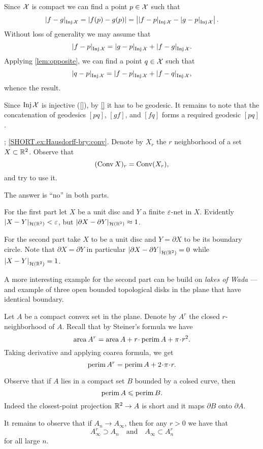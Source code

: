 Since $\mathcal{X}$ is compact we can find a point $p\in\mathcal{X}$ such that 
\[\dist{f}{g}{\Inj\spc{X}}=|f(p)-g(p)|=\left|\dist{f}{p}{\Inj\spc{X}}-\dist{g}{p}{\Inj\spc{X}}\right|.\]
Without loss of generality we may assume that 
\[\dist{f}{p}{\Inj\spc{X}}
=
\dist{g}{p}{\Inj\spc{X}}
+
\dist{f}{g}{\Inj\spc{X}}.\]
Applying \ref{lem:opposite}, we can find a point $q\in\mathcal{X}$ such that 
\[\dist{q}{p}{\Inj\spc{X}}
=
\dist{f}{p}{\Inj\spc{X}}
+
\dist{f}{q}{\Inj\spc{X}},\]
whence the result.

Since $\mathop{\rm Inj}\nolimits\mathcal{X}$ is injective (\ref{}), by \ref{} it has to be geodesic. It remains to note that the concatenation of geodesics $[pq]$, $[gf]$, and $[fq]$ forms a required geodesic $[pq]$.


; \ref{SHORT.ex:Hausdorff-bry:conv}.
Denote by $X_r$ the $r$ neighborhood of a set $X\z\subset \RR^2$.
Observe  that 
\[(\mathop{\rm Conv}\nolimits X)_r=\mathop{\rm Conv}\nolimits(X_r),\]
and try to use it.

The answer is ``no'' in both parts.

For the first part let $X$ be a unit disc and $Y$ a finite $\varepsilon$-net in $X$.
Evidently $|X-Y|_{\mathcal{H}(\mathbb{R}^2)}<\varepsilon$, 
but
$|\partial X-\partial Y|_{\mathcal{H}(\mathbb{R}^2)}\approx 1$.

For the second part take $X$ to be a unit disc and $Y=\partial X$ to be its boundary circle.
Note that $\partial X=\partial Y$ in particular $\dist{\partial X}{\partial Y}{\mathcal{H}(\RR^2)}=0$ while $\dist{ X}{ Y}{\mathcal{H}(\RR^2)}=1$.

A more interesting example for the second part can be build on {}\emph{lakes of Wada} --- and example of three open bounded topological disks in the plane that have identical boundary.

Let $A$ be a compact convex set in the plane.
Denote by $A^r$ the closed $r$-neighborhood of $A$.
Recall that by Steiner's formula we have
\[\area A^r=\area A+r\cdot\perim A+\pi\cdot r^2.\]
Taking derivative and applying coarea formula, we get 
\[\perim A^r=\perim A+2\cdot\pi\cdot r.\]

Observe that if $A$ lies in a compact set $B$ bounded by a colsed curve, then 
\[\operatorname{\rm perim}\nolimits A\leqslant \operatorname{\rm perim}\nolimits B.\]
Indeed the closest-point projection $\mathbb{R}^2\to A$ is short and it maps $\partial B$ onto $\partial A$.

It remains to observe that if $A_n\to A_\infty$, then for any $r>0$ we have that
\[A_\infty^r\supset A_n
\quad\text{and}\quad
A_\infty\subset A_n^r\]
for all large $n$.


